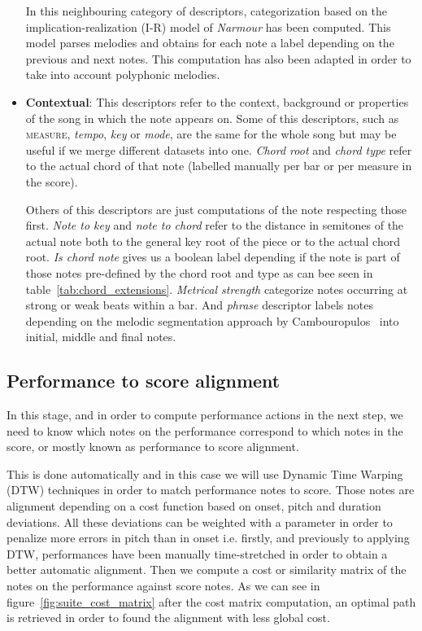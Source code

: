 \begin{itemize}
In this neighbouring category of descriptors, categorization based on the implication-realization (I-R) model of \textit{Narmour} has been computed.  This model parses melodies and obtains for each note a label depending on the previous and next notes. This computation has also been adapted in order to take into account polyphonic melodies. 

\item \textbf{Contextual}: This descriptors refer to the context, background or properties of the song in which the note appears on. Some of this descriptors, such as \textsc{measure}, \textit{tempo}, \textit{key} or \textit{mode}, are the same for the whole song but may be useful if we merge different datasets into one. \textit{Chord root} and \textit{chord type} refer to the actual chord of that note (labelled manually per bar or per measure in the score).

Others of this descriptors are just computations of the note respecting those first. \textit{Note to key} and \textit{note to chord} refer to the distance in semitones of the actual note both to the general key root of the piece or to the actual chord root. \textit{Is chord note} gives us a boolean label depending if the note is part of those notes pre-defined by the chord root and type as can bee seen in table~\ref{tab:chord_extensions}. \textit{Metrical strength} categorize notes occurring at strong or weak beats within a bar. And \textit{phrase} descriptor labels notes depending on the melodic segmentation approach by Cambouropulos~\cite{Cambouropoulos1997a} into initial, middle and final notes.

\end{itemize}



\subsection{Performance to score alignment}
\label{sec:p2salignment}

In this stage, and in order to compute performance actions in the next step, we need to know which notes on the performance correspond to which notes in the score, or mostly known as performance to score alignment.

This is done automatically and in this case we will use Dynamic Time Warping (DTW) techniques in order to match performance notes to score. Those notes are alignment depending on a cost function based on onset, pitch and duration deviations. All these deviations can be weighted with a parameter in order to penalize more errors in pitch than in onset i.e. firstly, and previously to applying DTW, performances have been manually time-stretched in order to obtain a better automatic alignment. Then we compute a cost or similarity matrix of the notes on the performance against score notes. As we can see in figure~\ref{fig:suite_cost_matrix} after the cost matrix computation, an optimal path is retrieved in order to found the alignment with less global cost.

